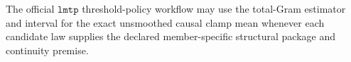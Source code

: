 The official \(\texttt{lmtp}\) threshold-policy workflow may use the total-Gram estimator and interval for the exact unsmoothed causal clamp mean whenever each candidate law supplies the declared member-specific structural package and continuity premise.